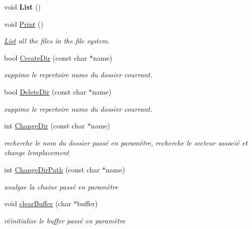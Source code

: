 \begin{DoxyCompactItemize}
\hypertarget{class_file_system_aaf76918c6f0d24bc72aaa84625adfddf}{}\label{class_file_system_aaf76918c6f0d24bc72aaa84625adfddf} 
void {\bfseries List} ()
\item 
void \hyperlink{class_file_system_aebaf06661b1879a62afefa5abe99f21e}{Print} ()
\begin{DoxyCompactList}\small\item\em \hyperlink{class_list}{List} all the files in the file system. \end{DoxyCompactList}\item 
bool \hyperlink{class_file_system_a8064a856821dd9c6a66ade6ff42e0974}{Create\+Dir} (const char $\ast$name)
\begin{DoxyCompactList}\small\item\em suppime le repertoire name du dossier courrant. \end{DoxyCompactList}\item 
bool \hyperlink{class_file_system_a1895af5b9242017d18dd7bfd349eeee4}{Delete\+Dir} (const char $\ast$name)
\begin{DoxyCompactList}\small\item\em suppime le repertoire name du dossier courrant. \end{DoxyCompactList}\item 
int \hyperlink{class_file_system_ab60a0afd7904cc1826d6964e4d6025e2}{Change\+Dir} (const char $\ast$name)
\begin{DoxyCompactList}\small\item\em recherche le nom du dossier passé en paramètre, recherche le secteur associé et change l\textquotesingle{}emplacement \end{DoxyCompactList}\item 
int \hyperlink{class_file_system_a1d0a587c40ecb3f5d768ee5faf03e771}{Change\+Dir\+Path} (const char $\ast$name)
\begin{DoxyCompactList}\small\item\em analyse la chaine passé en paramètre \end{DoxyCompactList}\item 
void \hyperlink{class_file_system_a0bc2ed13af3e6772c610ad1a8bd0c5aa}{clear\+Buffer} (char $\ast$buffer)
\begin{DoxyCompactList}\small\item\em réinitialise le buffer passé en paramètre \end{DoxyCompactList}\end{DoxyCompactItemize}
